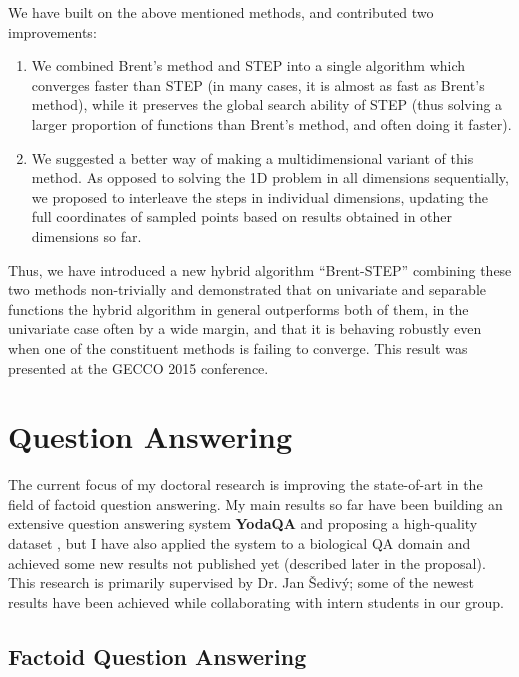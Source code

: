 We have built on the above mentioned methods, and contributed two improvements:

\begin{enumerate}
	\item We combined Brent's method and STEP into a single algorithm which converges faster than STEP (in many cases, it is almost as fast as Brent's method), while it preserves the global search ability of STEP (thus solving a larger proportion of functions than Brent's method, and often doing it faster).

	\item We suggested a better way of making a multidimensional variant of this method. As opposed to solving the 1D problem in all dimensions sequentially, we proposed to interleave the steps in individual dimensions, updating the full coordinates of sampled points based on results obtained in other dimensions so far.
\end{enumerate}

Thus, we have introduced a new hybrid algorithm ``Brent-STEP'' combining
these two methods non-trivially and demonstrated that
on univariate and separable functions the hybrid algorithm
in general outperforms both of them,
in the univariate case often by a wide margin,
and that it is behaving robustly even when one of the constituent methods
is failing to converge.
This result was presented at the GECCO 2015 conference.
\citep{ndsqistep}

\section{Question Answering}

The current focus of my doctoral research
is improving the state-of-art in the field of factoid question answering.
My main results so far have been
building an extensive question answering system \textbf{YodaQA} \citep{YodaQAPoster2015}
and proposing a high-quality dataset \citep{YodaQACLEF2015},
but I have also applied the system to a biological QA domain \citep{YodaQABioASQ2015}
and achieved some new results not published yet (described later in the proposal).
This research is primarily supervised by Dr. Jan Šedivý;
some of the newest results have been achieved while collaborating
with intern students in our group.

\subsection{Factoid Question Answering}

